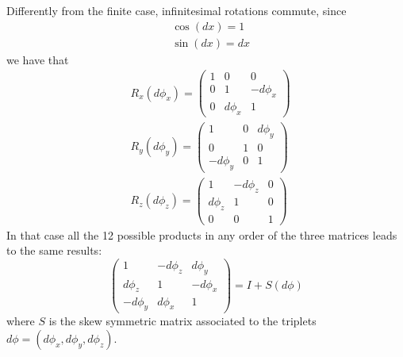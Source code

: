 \documentclass[10pt, letterpaper]{report}
\begin{document}
Differently from the finite case, infinitesimal rotations commute, since\begin{align}
   & \cos(dx)=1\\ 
    &\sin(dx)=dx
\end{align}
we have that  
\begin{align}
    &R_x(d\phi_x)=\begin{pmatrix}
        1&0&0\\ 0&1&-d\phi_x\\ 0 &d\phi_x & 1
    \end{pmatrix}\\
    &R_y(d\phi_y)=\begin{pmatrix}
        1&0&d\phi_y\\ 0&1&0\\  -d\phi_y&0 & 1
    \end{pmatrix}\\ 
    &R_z(d\phi_z)=\begin{pmatrix}
        1&-d\phi_z&0\\ d\phi_z&1&0\\  0&0 & 1
    \end{pmatrix}
\end{align}
In that case all the 12 possible products in any order of the three matrices leads to the same results:\begin{equation}
    \begin{pmatrix}
        1&-d\phi_z&d\phi_y\\ 
        d\phi_z&1&-d\phi_x\\ 
         -d\phi_y&d\phi_x & 1
    \end{pmatrix}=I+S(d\phi)
\end{equation}
where $S$ is the skew symmetric matrix associated to the triplets $d\phi=(d\phi_x,d\phi_y,d\phi_z)$.\bigskip
\end{document}
